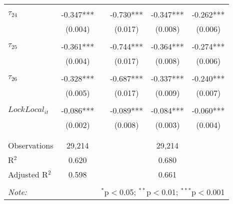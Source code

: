 \begin{tabular}{@{\extracolsep{-5pt}}lccccc}
                &           &&           &           &           \\[-2.1ex]
$\tau_{24}$     & -0.347*** && -0.730*** & -0.347*** & -0.262*** \\
                &  (0.004)  &&  (0.017)  &  (0.008)  &  (0.006)  \\
                &           &&           &           &           \\[-2.1ex]
$\tau_{25}$     & -0.361*** && -0.744*** & -0.364*** & -0.274*** \\
                &  (0.004)  &&  (0.017)  &  (0.008)  &  (0.006)  \\
                &           &&           &           &           \\[-2.1ex]
$\tau_{26}$     & -0.328*** && -0.687*** & -0.337*** & -0.240*** \\
                &  (0.005)  &&  (0.017)  &  (0.009)  &  (0.007)  \\
                &           &&           &           &           \\[-1.ex]
$LockLocal_{it}$ & -0.086*** && -0.089*** & -0.084*** & -0.060*** \\
                &  (0.002)  &&  (0.008)  &  (0.003)  &  (0.004)  \\
                &           &&           &           &           \\[-2.1ex]
\hline \\[-1.8ex] 
Observations     & 29,214 && \multicolumn{3}{c}{29,214} \\ 
R$^{2}$          &  0.620 && \multicolumn{3}{c}{0.680 } \\ 
Adjusted R$^{2}$ &  0.598 && \multicolumn{3}{c}{0.661 } \\ 
\hline 
\hline \\[-1.8ex] 
\textit{Note:}  & \multicolumn{5}{r}{$^{*}$p$<$0.05; $^{**}$p$<$0.01; $^{***}$p$<$0.001} \\ 
\end{tabular} 